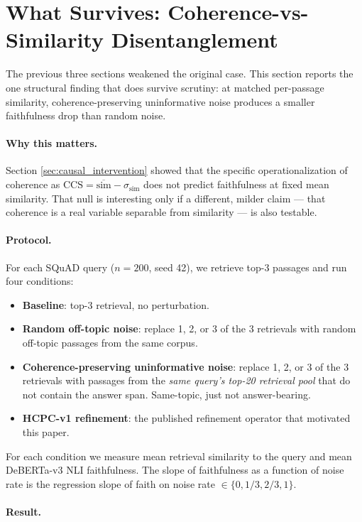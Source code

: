 \section{What Survives: Coherence-vs-Similarity Disentanglement}
\label{sec:coherence_noise}

The previous three sections weakened the original case. This
section reports the one structural finding that does survive
scrutiny: at matched per-passage similarity, coherence-preserving
uninformative noise produces a smaller faithfulness drop than random
noise.

\paragraph{Why this matters.}
Section \ref{sec:causal_intervention} showed that the specific
operationalization of coherence as
$\mathrm{CCS} = \overline{\mathrm{sim}} - \sigma_{\mathrm{sim}}$
does not predict faithfulness at fixed mean similarity. That null
is interesting only if a different, milder claim --- that
coherence is a real variable separable from similarity --- is also
testable.

\paragraph{Protocol.}
For each SQuAD query (\(n{=}200\), seed 42), we retrieve top-3
passages and run four conditions:
\begin{itemize}
\itemsep -2pt
\item \textbf{Baseline}: top-3 retrieval, no perturbation.
\item \textbf{Random off-topic noise}: replace 1, 2, or 3 of the 3
retrievals with random off-topic passages from the same corpus.
\item \textbf{Coherence-preserving uninformative noise}:
replace 1, 2, or 3 of the 3 retrievals with passages from the
\emph{same query's top-20 retrieval pool} that do not contain the
answer span. Same-topic, just not answer-bearing.
\item \textbf{HCPC-v1 refinement}: the published refinement
operator that motivated this paper.
\end{itemize}
For each condition we measure mean retrieval similarity to the
query and mean DeBERTa-v3 NLI faithfulness. The slope of
faithfulness as a function of noise rate is the regression slope of
faith on noise rate $\in\{0, 1/3, 2/3, 1\}$.

\paragraph{Result.}

